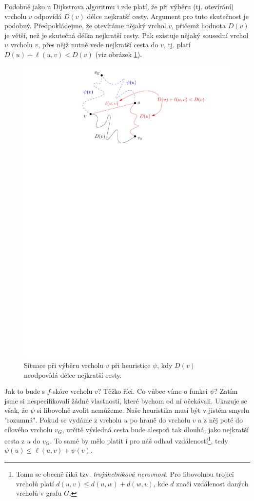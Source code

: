 Podobně jako u Dijkstrova algoritmu i zde platí, že při výběru (tj. otevírání) vrcholu $v$ odpovídá $D(v)$ délce nejkratší cesty. Argument pro tuto skutečnost je podobný. Předpokládejme, že otevíráme nějaký vrchol $v$, přičemž hodnota $D(v)$ je větší, než je skutečná délka nejkratší cesty. Pak existuje nějaký sousední vrchol $u$ vrcholu $v$, přes nějž nutně vede nejkratší cesta do $v$, tj. platí $D(u)+\ell(u,v)<D(v)$ (viz obrázek \ref{fig:astar_kratsi_cesta}).
\begin{figure}[h]
    \centering
    \includegraphics[scale=\graphimgsize]{01-grafalgo/images/ch01_astar_kratsi_cesta.pdf}
    \caption{Situace při výběru vrcholu $v$ při heuristice $\psi$, kdy $D(v)$ neodpovídá délce nejkratší cesty.}
    \label{fig:astar_kratsi_cesta}
\end{figure}
Jak to bude s $f$-skóre vrcholu $v$? Těžko říci. Co vůbec víme o funkci $\psi$? Zatím jsme si nespecifikovali žádné vlastnosti, které bychom od ní očekávali. Ukazuje se však, že $\psi$ si libovolně zvolit nemůžeme. Naše heuristika musí být v jistém smyslu "rozumná". Pokud se vydáme z vrcholu $u$ po hraně do vrcholu $v$ a z něj poté do cílového vrcholu $v_G$, určitě výsledná cesta bude alespoň tak dlouhá, jako nejkratší cesta z $u$ do $v_G$. To samé by mělo platit i pro náš odhad vzdáleností\footnote{Tomu se obecně říká tzv. \emph{trojúhelníková nerovnost}. Pro libovolnou trojici vrcholů platí $d(u,v)\leqslant d(u,w)+d(w,v)$, kde $d$ značí vzdálenost daných vrcholů v grafu $G$.}, tedy $\psi(u)\leqslant\ell(u,v)+\psi(v)$.


